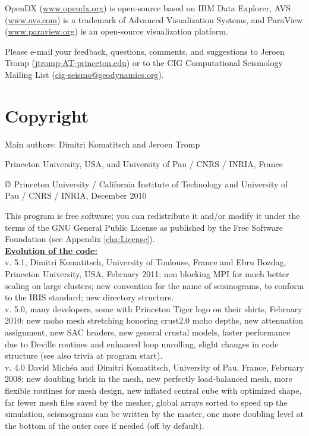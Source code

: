 \documentclass[oneside,english]{book}
\newcommand{\urlwithparentheses}[1]{(\url{#1})}
\begin{document}
OpenDX \urlwithparentheses{www.opendx.org} is open-source based on IBM Data Explorer,
AVS \urlwithparentheses{www.avs.com} is a trademark of Advanced Visualization Systems,
and ParaView \urlwithparentheses{www.paraview.org} is an open-source visualization
platform.{\small{} }{\small \par}

Please e-mail your feedback, questions, comments, and suggestions
to Jeroen Tromp \urlwithparentheses{jtromp-AT-princeton.edu} or to the CIG Computational Seismology Mailing List \urlwithparentheses{cig-seismo@geodynamics.org}.


\chapter*{\label{cha:Copyright}Copyright}

Main authors: Dimitri Komatitsch and Jeroen Tromp

Princeton University, USA,
and University of Pau / CNRS / INRIA, France

$\copyright$ Princeton University / California Institute of Technology and University of Pau / CNRS / INRIA, December 2010

This program is free software; you can redistribute it and/or modify
it under the terms of the GNU General Public License as published
by the Free Software Foundation (see Appendix \ref{cha:License}).\\

\textbf{\underline{Evolution of the code:}}\\

 v. 5.1, Dimitri Komatitsch, University of Toulouse, France and Ebru Bozdag, Princeton University, USA, February 2011:
     non blocking MPI for much better scaling on large clusters;
     new convention for the name of seismograms, to conform to the IRIS standard;
     new directory structure.\\

 v. 5.0, many developers, some with Princeton Tiger logo on their shirts, February 2010:
     new moho mesh stretching honoring crust2.0 moho depths,
     new attenuation assignment, new SAC headers, new general crustal models,
     faster performance due to Deville routines and enhanced loop unrolling,
     slight changes in code structure (see also trivia at program start).\\

 v. 4.0 David Mich\'ea and Dimitri Komatitsch, University of Pau, France, February 2008:
      new doubling brick in the mesh, new perfectly load-balanced mesh,
      more flexible routines for mesh design, new inflated central cube
      with optimized shape, far fewer mesh files saved by the mesher,
      global arrays sorted to speed up the simulation, seismograms can be
      written by the master, one more doubling level at the bottom
      of the outer core if needed (off by default).\\
\end{document}
